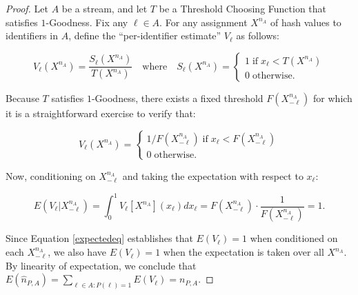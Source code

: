 \documentclass{article}
\newcommand{\xn}{X^{n_A}}
\newcommand{\xnml}{X^{n_A}_{-\ell}}
\begin{document}
\begin{proof}
Let $A$ be a stream, and let $T$ be a Threshold Choosing Function that satisfies $1$-Goodness. Fix any $\ell \in A$. For any assignment $\xn$ of hash values to identifiers in $A$,
define the ``per-identifier estimate'' $V_\ell$ as follows:

\begin{equation}\label{define-v-ell}
V_\ell(\xn) = \frac{S_\ell(\xn)}{T(\xn)}\quad \mathrm{where} \quad 
S_\ell(\xn) = \left\{
\begin{array}{l}
1 \;\mathrm{if}\; x_\ell < T(\xn) \\
0 \;\mathrm{otherwise}.
\end{array}\right.
\end{equation}

\noindent Because $T$ satisfies $1$-Goodness, there exists a fixed threshold $F(\xnml)$ for which it is
a straightforward exercise to verify that:

\begin{equation}\label{v-in-terms-of-f}
V_\ell(\xn) = \left\{
\begin{array}{l}
1 / F(\xnml)
\;\mathrm{if}\; x_\ell < F(\xnml) \\
0 \;\mathrm{otherwise}.
\end{array}\right.
\end{equation}

\noindent Now, conditioning on $\xnml$ and taking the expectation with respect to $x_\ell$:

\begin{equation} \label{expectedeq}
E(V_\ell | \xnml) = \int_0^1 V_\ell[\xn](x_\ell) dx_\ell = F(\xnml) \cdot \frac{1}{F(\xnml)} = 1.
\end{equation}

\noindent Since Equation \eqref{expectedeq} establishes that $E(V_\ell) = 1$ when conditioned on each $\xnml$, we also have
$E(V_\ell) = 1$ when the expectation is taken over all $\xn$.
By linearity of expectation, we conclude that
$E(\hat{n}_{P,A}) = \sum_{\ell \in A : P(\ell) = 1} E(V_\ell) = n_{P,A}.$
\end{proof}
\end{document}
